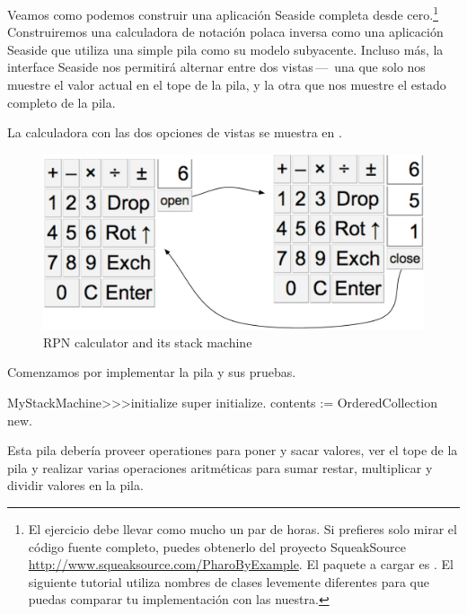 \documentclass[a4paper,10pt,twoside]{book}
\begin{document}

Veamos como podemos construir una aplicaci\'on Seaside completa desde cero.\footnote{El ejercicio debe llevar como mucho un par de horas.
Si prefieres solo mirar el c\'odigo fuente completo, puedes obtenerlo del proyecto SqueakSource \url{http://www.squeaksource.com/PharoByExample}.
El paquete a cargar es  . El siguiente tutorial utiliza  nombres de clases levemente diferentes para que puedas comparar tu implementaci\'on con las nuestra.}
Construiremos una calculadora de notaci\'on polaca inversa como una aplicaci\'on Seaside que utiliza una simple pila  como su modelo subyacente.
Incluso m\'as, la interface Seaside nos permitir\'a alternar entre dos vistas\,---\, una que solo nos muestre  el valor actual en el tope de la pila, y la otra que nos muestre el estado completo de la pila.

La calculadora con las dos opciones de vistas se muestra en .

\begin{figure}[ht]
\begin{center}
\includegraphics[width=\textwidth]{stackMachine}
\caption{RPN calculator and its stack machine}
\end{center}
\end{figure}

Comenzamos por implementar la pila y sus pruebas.


\begin{code}{}
MyStackMachine>>>initialize
	super initialize.
	contents := OrderedCollection new.
\end{code}

Esta pila deber\'ia proveer operationes para poner y sacar valores, ver el tope de la pila y realizar varias operaciones aritm\'eticas para sumar
restar, multiplicar y dividir valores en la pila.
\end{document}
